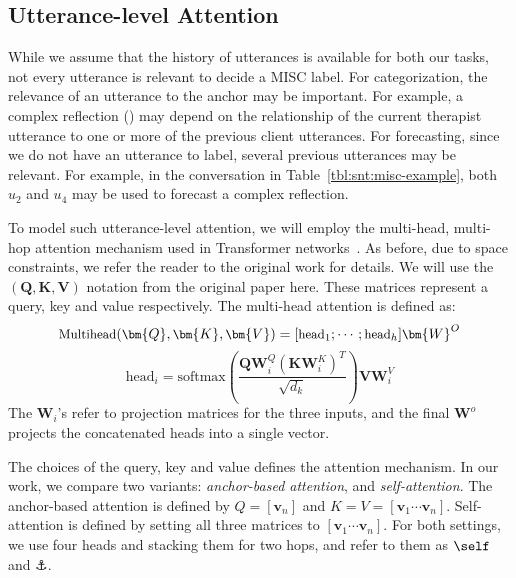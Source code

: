 \subsection{Utterance-level Attention}
\label{ssec:sentence_att}
While we assume that the history of utterances is available for both
our tasks, not every utterance is relevant to decide a MISC label.
%
For categorization, the relevance of an utterance to the anchor may
be important. For example, a complex reflection (\REC) may depend on
the relationship of the current therapist utterance to one or more
of the previous client utterances. For forecasting, since we do not
have an utterance to label, several previous utterances may
be relevant. For example, in the conversation in
Table~\ref{tbl:snt:misc-example}, both $u_2$ and $u_4$ may be used to
forecast a complex reflection.

To model such utterance-level attention, we will employ the
multi-head, multi-hop attention mechanism used in Transformer
networks~\cite{NIPS2017_7181}. As before, due to space constraints,
we refer the reader to the original work for details. We will use
the $(\bm{Q}, \bm{K}, \bm{V})$ notation from the original paper
here. These matrices represent a query, key and value
respectively. The multi-head attention is defined as:
%
\begin{equation}
\label{eq:multihead_attention}
{\small \text{Multihead}(\bm{Q},\bm{K},\bm{V}) = [\text{head}_{1};\cdots; \text{head}_{h}]\bm{W}^{O}}
\end{equation}
\begin{equation*}
 \text{head}_{i} = \text{softmax}\left(\frac{\bm{Q}\bm{W}^{Q}_{i}\left(\bm{K}\bm{W}^{K}_{i}\right)^T}{\sqrt{d_{k}}}\right)\bm{V}\bm{W}^{V}_{i}
\end{equation*}
The $\bm{W}_i$'s refer to projection matrices for the three inputs,
and the final $\bm{W}^o$ projects the concatenated heads into a
single vector.

The choices of the query, key and value defines the attention
mechanism. In our work, we compare two variants: {\em anchor-based
  attention}, and {\em self-attention}. The anchor-based attention
is defined by $Q = [\bm{v}_{n}]$ and
$K=V=[\bm{v}_{1} \cdots \bm{v}_{n}]$.  Self-attention is defined by
setting all three matrices to $[\bm{v}_{1} \cdots \bm{v}_{n}]$.
%
For both settings, we use four heads and stacking them for two hops,
and refer to them as $\self$ and $\anchor$.


